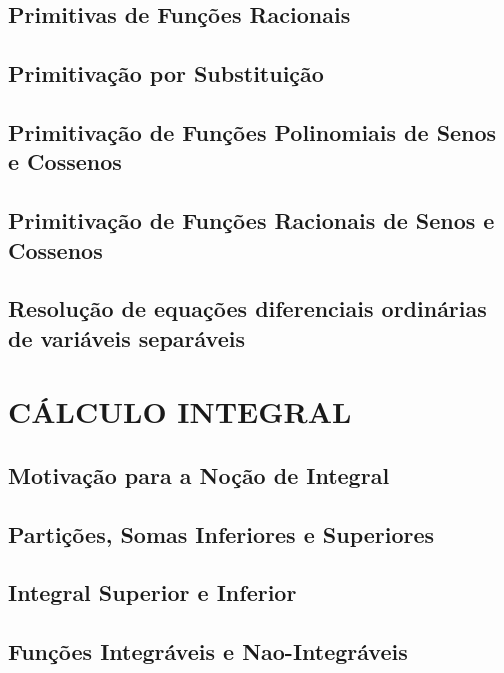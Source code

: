 \documentclass[11pt]{article}
\begin{document}
\subsection{Primitivas de Funções Racionais}

\subsection{Primitivação por Substituição}

\subsection{Primitivação de Funções Polinomiais de Senos e Cossenos}

\subsection{Primitivação de Funções Racionais de Senos e Cossenos}

\subsection{Resolução de equações diferenciais ordinárias de variáveis separáveis}



\newpage

\section{\MakeUppercase{Cálculo Integral}}

\subsection{Motivação para a Noção de Integral}

\subsection{Partições, Somas Inferiores e Superiores}

\subsection{Integral Superior e Inferior}

\subsection{Funções Integráveis e Nao-Integráveis}
\end{document}
